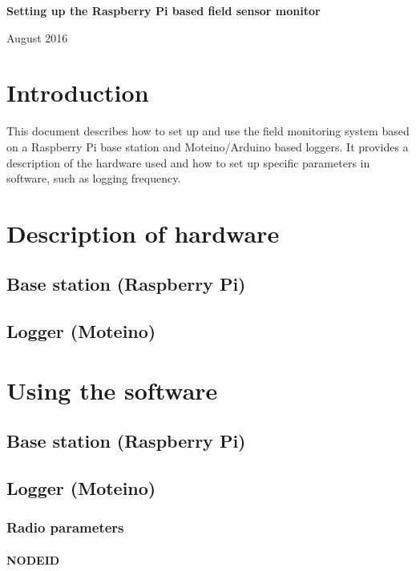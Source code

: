 \documentclass[10pt]{article}
\begin{document}
\begin{center}
\textbf{Setting up the Raspberry Pi based field sensor monitor}

August 2016
\end{center}
\newpage

\tableofcontents
\newpage

\section{Introduction}

This document describes how to set up and use the field monitoring system based on a Raspberry Pi base station and Moteino/Arduino based loggers. It provides a 
description of the hardware used and how to set up specific parameters in software, such as logging frequency.

\section{Description of hardware}

\subsection{Base station (Raspberry Pi)}

\subsection{Logger (Moteino)}

\section{Using the software}

\subsection{Base station (Raspberry Pi)}

\subsection{Logger (Moteino)}

\subsubsection{Radio parameters}

\paragraph{NODEID}
\end{document}
